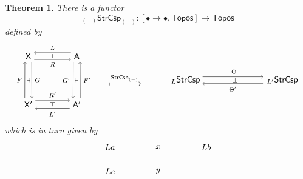 \documentclass{amsart}
\newcommand{\A}{\cat{A}}
\newcommand{\X}{\cat{X}}
\newcommand{\Topos}{\cat{Topos}}
\newcommand{\StrCsp}{\cat{StrCsp}}
\newcommand{\cat}[1]{\mathsf{#1}}
\newcommand{\from}{\colon}
\newtheorem{theorem}{Theorem}[section]
\theoremstyle{remark}
\theoremstyle{definition}
\begin{document}
\begin{theorem} \label{thm:strcsp-isfunctorial}
  There is a functor
  \[
    _{(-)}\StrCsp_{(-)} \from
    [ \bullet \to \bullet , \Topos ]
    \to
    \Topos
  \]
  defined by  
  \[
    \begin{tikzpicture}
      \begin{scope}
        \node (1) at (-1,1) {\( \X \)}; \node (2) at (-1,-1)
        {\( \X' \)}; \node (3) at (1,1) {\( \A \)}; \node
        (4) at (1,-1) {\( \A' \)}; \draw [->] (1.-60) to
        node [right] {\scriptsize{\( G \)}} (2.60); \draw
        [<-] (1.-120) to node [left] {\scriptsize{\( F \)}}
        (2.120); \draw [<-] (1.30) to node [above]
        {\scriptsize{\( L \)}} (3.150); \draw [->] (1.-30)
        to node [below] {\scriptsize{\( R \)}} (3.-150);
        \draw [->] (2.30) to node [above]
        {\scriptsize{\( R' \)}} (4.150); \draw [<-] (2.-30)
        to node [below] {\scriptsize{\( L' \)}} (4.-150);
        \draw [<-] (3.-60) to node [right]
        {\scriptsize{\( F' \)}} (4.60); \draw [->] (3.-120)
        to node [left] {\scriptsize{\( G' \)}} (4.120);
        \node (5) at (0,-1) {\scriptsize{\( \top \)}}; \node
        (6) at (0,1) {\scriptsize{\( \perp \)}}; \node (7)
        at (-1,0) {\scriptsize{\( \dashv \)}}; \node (8) at
        (1,0) {\scriptsize{\( \vdash \)}};
      \end{scope}
      \begin{scope}[shift={(3,0)}]
      \node (1) at (0,0) { $\xmapsto{ \StrCsp_{(-)} }$ };
      \end{scope}
      \begin{scope}[shift={(5.5,0)}]
      \node (1) [inner sep=0.1cm] at (0,0) {\( _{L}\StrCsp \)};
      \node (2) [inner sep=0.15cm] at (4,0) {\( _{L'}\StrCsp \)};
      \node (3) at (2,0) {\scriptsize{ \( \perp \) }};
      \draw [->]
        ([yshift= 4pt]1.east) to
        node [above] {\scriptsize{ \( \Theta \) }}
        ([yshift= 4pt]2.west);
      \draw [->]
        ([yshift= -4pt]2.west) to
        node [below] {\scriptsize{ \( \Theta' \) } }
        ([yshift= -4pt]1.east);  
      \end{scope}
    \end{tikzpicture}
  \]
  which is in turn given by
  \[
    \begin{tikzpicture}
      \begin{scope}
      \node (1) at (-2,1) {\( La \)};
      \node (2) at (0,1) {\( x \)};
      \node (3) at (2,1) {\( Lb \)};
      \node (4) at (-2,0) {\( Lc \)};
      \node (5) at (0,0) {\( y \)};

\end{scope}
\end{tikzpicture}\]
\end{theorem}
\end{document}
